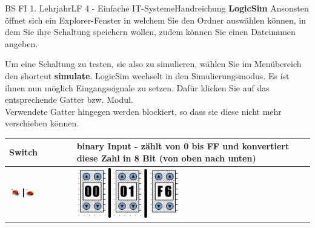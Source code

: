 \documentclass[11pt,oneside,openany,headings=optiontotoc,11pt,numbers=noenddot]{article}
\begin{document}
\begin{worksheet}{BS FI 1. Lehrjahr}{LF 4 - Einfache IT-Systeme}{Handreichung \textbf{LogicSim}}
		\noindent
		Ansonsten öffnet sich ein Explorer-Fenster in welchem Sie den Ordner auswählen können, in dem Sie ihre Schaltung speichern wollen, zudem können Sie einen Dateinamen angeben.\\
		\par\noindent
		Um eine Schaltung zu testen, sie also zu simulieren, wählen Sie im Menübereich den shortcut \textbf{simulate}. LogicSim wechselt in den Simulierungsmodus. Es ist ihnen nun möglich Eingangssignale zu setzen. Dafür klicken Sie auf das entsprechende Gatter bzw. Modul.\\
		Verwendete Gatter hingegen werden blockiert, so dass sie diese nicht mehr verschieben können.\\
		\par\noindent
		\begin{tabularx}{\textwidth}{M|M}
			\textbf{Switch} & \textbf{binary Input} - zählt von 0 bis FF und konvertiert diese Zahl in 8 Bit (von oben nach unten)\\
			\hline
			\hline
			\includegraphics[width=0.45\textwidth,align=t]{../99_Bilder/switch.jpg} & \includegraphics[width=0.45\textwidth,align=t]{../99_Bilder/binIn.jpg}
		\end{tabularx}
	\end{worksheet}
\end{document}
